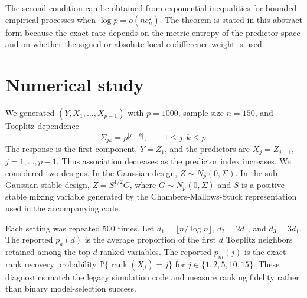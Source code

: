 \documentclass[11pt]{article}
\theoremstyle{definition}
\newcommand{\Prob}{\mathbb{P}}
\newcommand{\rank}{\operatorname{rank}}
\begin{document}
The second condition can be obtained from exponential inequalities for bounded empirical processes when \(\log p=o(nc_n^2)\).  The theorem is stated in this abstract form because the exact rate depends on the metric entropy of the predictor space and on whether the signed or absolute local codifference weight is used.



\section{Numerical study}\label{sec:numerical}

We generated \((Y,X_1,\ldots,X_{p-1})\) with \(p=1000\), sample size \(n=150\), and Toeplitz dependence
\[
\Sigma_{jk}=\rho^{|j-k|},\qquad 1\le j,k\le p.
\]
The response is the first component, \(Y=Z_1\), and the predictors are \(X_j=Z_{j+1}\), \(j=1,\ldots,p-1\).  Thus association decreases as the predictor index increases.  We considered two designs.  In the Gaussian design, \(Z\sim N_p(0,\Sigma)\).  In the sub-Gaussian stable design, \(Z=S^{1/2}G\), where \(G\sim N_p(0,\Sigma)\) and \(S\) is a positive stable mixing variable generated by the Chambers-Mallows-Stuck representation used in the accompanying code.

Each setting was repeated 500 times.  Let \(d_1=\lfloor n/\log n\rfloor\), \(d_2=2d_1\), and \(d_3=3d_1\).  The reported \(p_a(d)\) is the average proportion of the first \(d\) Toeplitz neighbors retained among the top \(d\) ranked variables.  The reported \(p_m(j)\) is the exact-rank recovery probability \(\Prob\{\rank(X_j)=j\}\) for \(j\in\{1,2,5,10,15\}\).  These diagnostics match the legacy simulation code and measure ranking fidelity rather than binary model-selection success.
\end{document}
